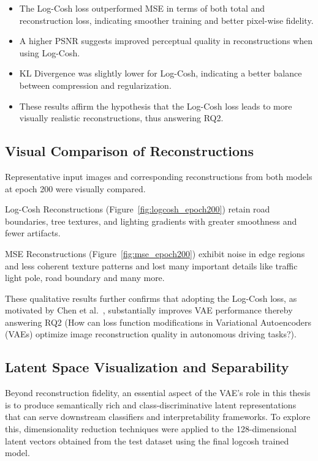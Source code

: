 \begin{itemize}
    \item The Log-Cosh loss outperformed MSE in terms of both total and reconstruction loss, indicating smoother training and better pixel-wise fidelity.
    \item A higher PSNR suggests improved perceptual quality in reconstructions when using Log-Cosh.
    \item KL Divergence was slightly lower for Log-Cosh, indicating a better balance between compression and regularization.
    \item These results affirm the hypothesis that the Log-Cosh loss leads to more visually realistic reconstructions, thus answering RQ2.
\end{itemize}



\subsection{Visual Comparison of Reconstructions} \label{subsubsec:vae_visual_recon}
Representative input images and corresponding reconstructions from both models at epoch 200 were visually compared.

Log-Cosh Reconstructions (Figure~\ref{fig:logcosh_epoch200}) retain road boundaries, tree textures, and lighting gradients with greater smoothness and fewer artifacts.

MSE Reconstructions (Figure~\ref{fig:mse_epoch200}) exhibit noise in edge regions and less coherent texture patterns and lost many important details like traffic light pole, road boundary and many more.

These qualitative results further confirms that adopting the Log-Cosh loss, as motivated by Chen et al.~\cite{chen2019log}, substantially improves VAE performance thereby answering RQ2 (How can loss function modifications in Variational Autoencoders (VAEs) optimize image reconstruction quality in autonomous driving tasks?).


\subsection{Latent Space Visualization and Separability} \label{subsubsec:vae_latent_space}

Beyond reconstruction fidelity, an essential aspect of the VAE's role in this thesis is to produce semantically rich and class-discriminative latent representations that can serve downstream classifiers and interpretability frameworks. To explore this, dimensionality reduction techniques were applied to the 128-dimensional latent vectors obtained from the test dataset using the final logcosh trained model.

